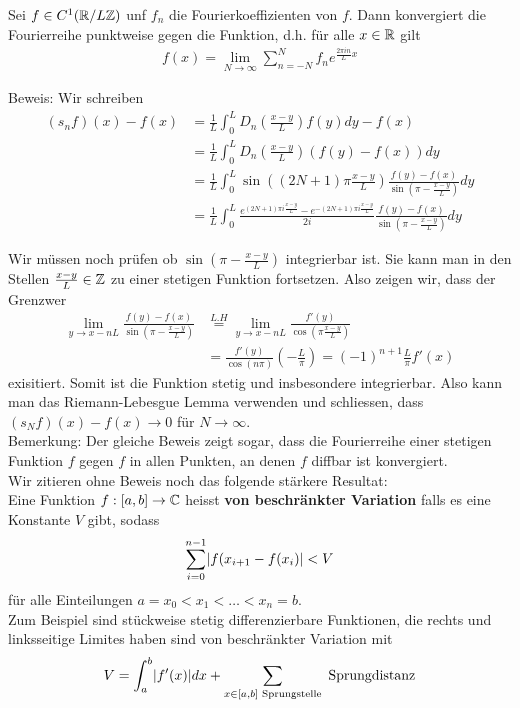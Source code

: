 \begin{satz}[]
	Sei $f \in C^1(\mathbb{R}/L\mathbb{Z})$ unf $f_n$ die Fourierkoeffizienten von $f$. Dann konvergiert die Fourierreihe punktweise gegen die Funktion, d.h. für alle $x \in \mathbb{R}$ gilt
	\begin{align*}
	f(x) = \lim_{N \to \infty}\sum_{n = -N}^{N}f_n e^{\frac{2\pi i n}{L}x}
	\end{align*}
\end{satz}
Beweis: Wir schreiben
\begin{align*}
	(s_nf)(x) - f(x) &= \frac{1}{L} \int_{0}^{L}D_n \left(\frac{x-y}{L}\right)f(y)dy - f(x)\\
									 &= \frac{1}{L}\int_{0}^{L}D_n \left(\frac{x-y}{L}\right)(f(y) - f(x)) dy \\
									 &= \frac{1}{L}\int_{0}^{L} \sin \left((2N+1)\pi \frac{x-y}{L}\right) \frac{f(y) - f(x)}{\sin \left(\pi - \frac{x-y}{L}\right)}dy\\
									 &= \frac{1}{L}\int_{0}^{L} \frac{e^{(2N+1)\pi i \frac{x-y}{L}}- e^{-(2N+1)\pi i \frac{x-y}{L}}}{2i} \frac{f(y) - f(x)}{\sin \left(\pi - \frac{x-y}{L}\right)}dy
\end{align*}

Wir müssen noch prüfen ob $\sin \left(\pi - \frac{x-y}{L}\right)$ integrierbar ist. Sie kann man in den Stellen $\frac{x-y}{L} \in \mathbb{Z}$ zu einer stetigen Funktion fortsetzen. Also zeigen wir, dass der Grenzwer
\begin{align*}
	\lim_{y \to x - nL} \frac{f(y) - f(x)}{\sin \left(\pi - \frac{x-y}{L}\right)} &\stackrel{L.H}{=} \lim_{y \to x - nL} \frac{f'(y)}{\cos \left(\pi \frac{x-y}{L}\right)}	\\
																																								&= \frac{f'(y)}{\cos(n\pi)} \left(- \frac{L}{\pi}\right) = (-1)^{n+1} \frac{L}{\pi}f'(x) 
\end{align*}
exisitiert. Somit ist die Funktion stetig und insbesondere integrierbar. Also kann man das Riemann-Lebesgue Lemma verwenden und schliessen, dass $(s_Nf)(x) - f(x) \to 0$ für $N \to \infty$.\\


Bemerkung: Der gleiche Beweis zeigt sogar, dass die Fourierreihe einer stetigen Funktion $f$ gegen $f$ in allen Punkten, an denen $f$ diffbar ist konvergiert.\\

Wir zitieren ohne Beweis noch das folgende stärkere Resultat:\\
Eine Funktion $f: [a,b] \to \mathbb{C}$ heisst \textbf{von beschränkter Variation}  falls es eine Konstante $V$ gibt, sodass
\begin{align*}
	\sum_{i = 0}^{n-1} \abs{f(x_{i+1} - f(x_i)} < V
\end{align*}
für alle Einteilungen $a = x_0 < x_1 < \ldots < x_n = b$.\\
Zum Beispiel sind stückweise stetig differenzierbare Funktionen, die rechts und linksseitige Limites haben sind von beschränkter Variation mit
\begin{align*}
	V = \int_{a}^{b} \abs{f'(x)}dx + \sum_{x \in [a,b] \text{ Sprungstelle}} \text{ Sprungdistanz}
\end{align*}

